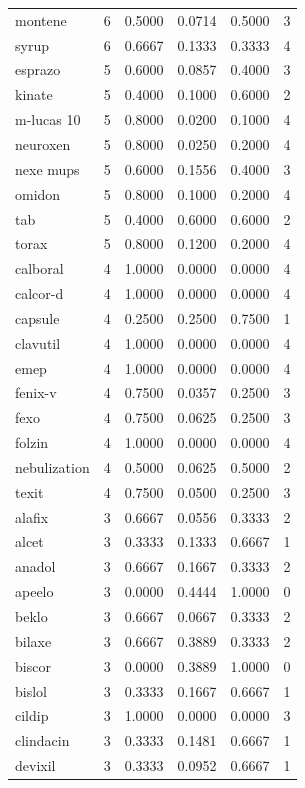 \begin{longtable}{p{3.0cm}rrrrr}
montene & 6 & 0.5000 & 0.0714 & 0.5000 & 3 \\
syrup & 6 & 0.6667 & 0.1333 & 0.3333 & 4 \\
esprazo & 5 & 0.6000 & 0.0857 & 0.4000 & 3 \\
kinate & 5 & 0.4000 & 0.1000 & 0.6000 & 2 \\
m-lucas 10 & 5 & 0.8000 & 0.0200 & 0.1000 & 4 \\
neuroxen & 5 & 0.8000 & 0.0250 & 0.2000 & 4 \\
nexe mups & 5 & 0.6000 & 0.1556 & 0.4000 & 3 \\
omidon & 5 & 0.8000 & 0.1000 & 0.2000 & 4 \\
tab & 5 & 0.4000 & 0.6000 & 0.6000 & 2 \\
torax & 5 & 0.8000 & 0.1200 & 0.2000 & 4 \\
calboral & 4 & 1.0000 & 0.0000 & 0.0000 & 4 \\
calcor-d & 4 & 1.0000 & 0.0000 & 0.0000 & 4 \\
capsule & 4 & 0.2500 & 0.2500 & 0.7500 & 1 \\
clavutil & 4 & 1.0000 & 0.0000 & 0.0000 & 4 \\
emep & 4 & 1.0000 & 0.0000 & 0.0000 & 4 \\
fenix-v & 4 & 0.7500 & 0.0357 & 0.2500 & 3 \\
fexo & 4 & 0.7500 & 0.0625 & 0.2500 & 3 \\
folzin & 4 & 1.0000 & 0.0000 & 0.0000 & 4 \\
nebulization & 4 & 0.5000 & 0.0625 & 0.5000 & 2 \\
texit & 4 & 0.7500 & 0.0500 & 0.2500 & 3 \\
alafix & 3 & 0.6667 & 0.0556 & 0.3333 & 2 \\
alcet & 3 & 0.3333 & 0.1333 & 0.6667 & 1 \\
anadol & 3 & 0.6667 & 0.1667 & 0.3333 & 2 \\
apeelo & 3 & 0.0000 & 0.4444 & 1.0000 & 0 \\
beklo & 3 & 0.6667 & 0.0667 & 0.3333 & 2 \\
bilaxe & 3 & 0.6667 & 0.3889 & 0.3333 & 2 \\
biscor & 3 & 0.0000 & 0.3889 & 1.0000 & 0 \\
bislol & 3 & 0.3333 & 0.1667 & 0.6667 & 1 \\
cildip & 3 & 1.0000 & 0.0000 & 0.0000 & 3 \\
clindacin & 3 & 0.3333 & 0.1481 & 0.6667 & 1 \\
devixil & 3 & 0.3333 & 0.0952 & 0.6667 & 1 \\

\end{longtable}
